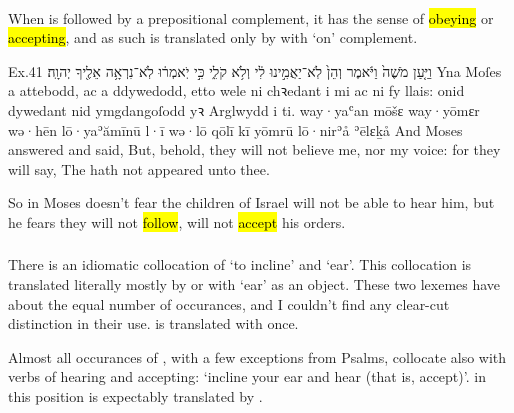 \paragraph{}


\begin{paper}
	When  is followed by a prepositional complement, it has the sense of \hl{obeying} or \hl{accepting}, and as such is translated only by  with  ‘on’ complement.
\end{paper}

\begin{example}{Ex.}{4}{1}{}{}
	\quoling
	{וַיַּ֤עַן מֹשֶׁה֙ וַיֹּ֔אמֶר וְהֵן֙ לֹֽא־יַאֲמִ֣ינוּ לִ֔י וְלֹ֥א  קֹלִ֑י כִּ֣י יֹֽאמְר֔וּ לֹֽא־נִרְאָ֥ה אֵלֶ֖יךָ יְהוָֽה׃}
	{Yna Moſes a attebodd, ac a ddywedodd, etto wele ni chꝛedant i mi ac ni   fy llais: onid dywedant nid ymgdangoſodd yꝛ Arglwydd i ti.}
	{way·yaʿan mōšɛ way·yōmɛr wə·hēn lō·yaʾămīnū l·ī wə·lō  qōlī kī yōmrū lō·nirʾå ʾēlɛḵå {\YHWH}}
	{And Moses answered and said, But, behold, they will not believe me, nor   my voice: for they will say, The {\LORD} hath not appeared unto thee.}
\end{example}
\begin{paper}
	\explain So in  Moses doesn’t fear the children of Israel will not be able to hear him, but he fears they will not \hl{follow}, will not \hl{accept} his orders.
\end{paper}



\subsubsection{}


\begin{paper}
	There is an idiomatic collocation of  ‘to incline’ and  ‘ear’. This collocation is translated literally mostly by  or  with  ‘ear’ as an object. These two lexemes have about the equal number of occurances, and I couldn’t find any clear-cut distinction in their use.  is translated with  once.

	Almost all occurances of , with a few exceptions from Psalms, collocate also with verbs of hearing and accepting: ‘incline your ear and hear (that is, accept)’.  in this position is expectably translated by .
\end{paper}

